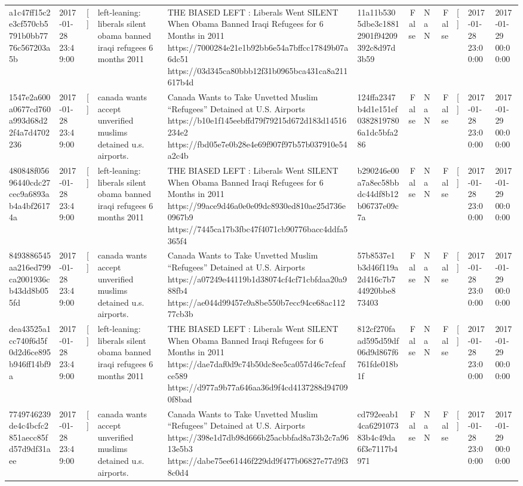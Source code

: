\begin{tabular}{llllllrlrlll}
a1c47ff15c2e3cf570cb5791b0bb7776c567203a5b & 2017-01-28 23:49:00 & [] & left-leaning: liberals silent obama banned iraqi refugees 6 months 2011 & THE BIASED LEFT : Liberals Went SILENT When Obama Banned Iraqi Refugees for 6 Months in 2011 https://7000284e21e1b92bb6e54a7bffcc17849b07a6dc51 https://03d345ca80bbb12f31b0965bca431ca8a211617b4d & 11a11b5305dbe3c18812901f94209392c8d97d3b59 & False & NaN & False & [] & 2017-01-28 23:00:00 & 2017-01-29 00:00:00 \\
1547e2a600a0677cd760a993d68d22f4a7d4702236 & 2017-01-28 23:49:00 & [] & canada wants accept unverified muslims detained u.s. airports. & Canada Wants to Take Unvetted Muslim “Refugees” Detained at U.S. Airports https://b10e1f145eebffd79f79215d672d183d14516234e2 https://fbd05e7e0b28e4e69f907f97b57b037910e54a2c4b & 124ffa2347b4d1e151ef03828197806a1dc5bfa286 & False & NaN & False & [] & 2017-01-28 23:00:00 & 2017-01-29 00:00:00 \\
480848f05696440cdc27cec9a6893ab4a4bf26174a & 2017-01-28 23:49:00 & [] & left-leaning: liberals silent obama banned iraqi refugees 6 months 2011 & THE BIASED LEFT : Liberals Went SILENT When Obama Banned Iraqi Refugees for 6 Months in 2011 https://99ace9d46a0e0e09dc8930ed810ae25d736e0967b9 https://7445ca17b3fbc47f4071cb90776bacc4ddfa5365f4 & b290246e00a7a8ec58bbdc44df8b12b06737e09c7a & False & NaN & False & [] & 2017-01-28 23:00:00 & 2017-01-29 00:00:00 \\
8493886545aa216ed799ca2001936cb43dd8b055fd & 2017-01-28 23:49:00 & [] & canada wants accept unverified muslims detained u.s. airports. & Canada Wants to Take Unvetted Muslim “Refugees” Detained at U.S. Airports https://a07249e44119b1d38074cf4cf71cbfdaa20a988fb4 https://ae044d99457e9a8be550b7ecc94ce68ac11277cb3b & 57b8537e1b3d46f119a2d416c7b744920bbe873403 & False & NaN & False & [] & 2017-01-28 23:00:00 & 2017-01-29 00:00:00 \\
dea43525a1cc740f6d5f0d2d6ce895b946ff14bf9a & 2017-01-28 23:49:00 & [] & left-leaning: liberals silent obama banned iraqi refugees 6 months 2011 & THE BIASED LEFT : Liberals Went SILENT When Obama Banned Iraqi Refugees for 6 Months in 2011 https://dae7daf0d9c74b50dc8ee5ca057d46c7cfeafce589 https://d977a9b77a646aa36d9f4cd4137288d947090f8bad & 812cf270faad595d59df06d9d867f6761fde018b1f & False & NaN & False & [] & 2017-01-28 23:00:00 & 2017-01-29 00:00:00 \\
7749746239de4c4bcfc2851aecc85fd57d9df31aee & 2017-01-28 23:49:00 & [] & canada wants accept unverified muslims detained u.s. airports. & Canada Wants to Take Unvetted Muslim “Refugees” Detained at U.S. Airports https://398e1d7db98d666b25acbbfad8a73b2c7a9613e5b3 https://dabe75ee61446f229dd9f477b06827e77d9f38c0d4 & cd792eeab14ca629107383b4c49da6f3e7117b4971 & False & NaN & False & [] & 2017-01-28 23:00:00 & 2017-01-29 00:00:00 \\

\end{tabular}
